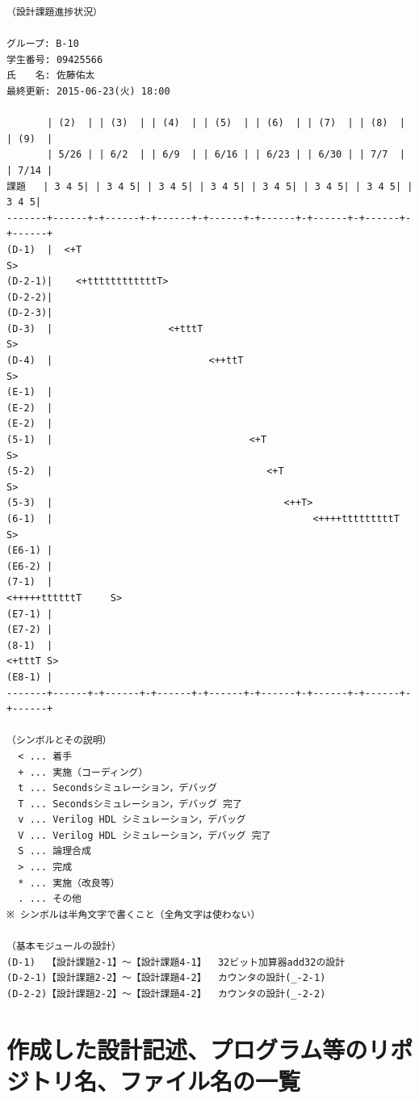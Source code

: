 \documentclass{jarticle}[11pt]
\begin{document}
\begin{verbatim}
（設計課題進捗状況）

グループ: B-10
学生番号: 09425566
氏　　名: 佐藤佑太
最終更新: 2015-06-23(火) 18:00

       | (2)  | | (3)  | | (4)  | | (5)  | | (6)  | | (7)  | | (8)  | | (9)  | 
       | 5/26 | | 6/2  | | 6/9  | | 6/16 | | 6/23 | | 6/30 | | 7/7  | | 7/14 |
課題   | 3 4 5| | 3 4 5| | 3 4 5| | 3 4 5| | 3 4 5| | 3 4 5| | 3 4 5| | 3 4 5|
-------+------+-+------+-+------+-+------+-+------+-+------+-+------+-+------+
(D-1)  |  <+T                                                               S>
(D-2-1)|    <+ttttttttttttT>                                             
(D-2-2)|  
(D-2-3)|  
(D-3)  |                    <+tttT                                          S> 
(D-4)  |                           <++ttT                                   S>
(E-1)  |
(E-2)  |
(E-2)  |
(5-1)  |                                  <+T                                S>
(5-2)  |                                     <+T                             S>
(5-3)  |                                        <++T>                    
(6-1)  |                                             <++++tttttttttT         S>
(E6-1) |
(E6-2) |
(7-1)  |                                                   <+++++ttttttT     S>
(E7-1) |
(E7-2) |
(8-1)  |                                                              <+tttT S>
(E8-1) |
-------+------+-+------+-+------+-+------+-+------+-+------+-+------+-+------+

（シンボルとその説明）
  < ... 着手
  + ... 実施（コーディング）
  t ... Secondsシミュレーション，デバッグ
  T ... Secondsシミュレーション，デバッグ 完了
  v ... Verilog HDL シミュレーション，デバッグ
  V ... Verilog HDL シミュレーション，デバッグ 完了
  S ... 論理合成  
  > ... 完成
  * ... 実施（改良等）
  . ... その他
※ シンボルは半角文字で書くこと（全角文字は使わない）

（基本モジュールの設計）
(D-1)  【設計課題2-1】〜【設計課題4-1】	32ビット加算器add32の設計
(D-2-1)【設計課題2-2】〜【設計課題4-2】	カウンタの設計(_-2-1)
(D-2-2)【設計課題2-2】〜【設計課題4-2】	カウンタの設計(_-2-2)
\end{verbatim}




\section{作成した設計記述、プログラム等のリポジトリ名、ファイル名の一覧}
\label{sec:作成した設計記述、プログラム等のリポジトリ名、ファイル名の一覧}
\end{document}
